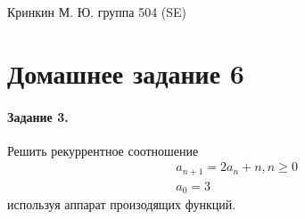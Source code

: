 \documentclass[a4paper,12pt]{article}
\begin{document}
\sloppy

\lstset{
	basicstyle=\small,
	stringstyle=\ttfamily,
	showstringspaces=false,
	columns=fixed,
	breaklines=true,
	numbers=right,
	numberstyle=\tiny
}

\newtheorem{Def}{Определение}[section]
\newtheorem{Th}{Теорема}
\newtheorem{Lem}[Th]{Лемма}
\newenvironment{Proof}
	{\par\noindent{\bf Доказательство.}}
	{\hfill$\scriptstyle\blacksquare$}
\newenvironment{Solution}
	{\par\noindent{\bf Решение.}}
	{\hfill$\scriptstyle\blacksquare$}


\begin{flushright}
	Кринкин М. Ю. группа 504 (SE)
\end{flushright}

\section{Домашнее задание 6}

\paragraph{Задание 3.} Решить рекуррентное соотношение
\[
	\begin{split}
		& a_{n+1} = 2 a_n + n, n \ge 0 \\
		& a_0 = 3
	\end{split}
\]
используя аппарат произодящих функций.
\end{document}
